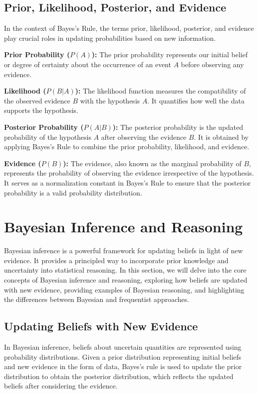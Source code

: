 \documentclass[12pt]{book} %
\begin{document}
\subsection{Prior, Likelihood, Posterior, and Evidence}
In the context of Bayes's Rule, the terms prior, likelihood, posterior, and evidence play crucial roles in updating probabilities based on new information.

\textbf{Prior Probability (\(P(A)\)):} The prior probability represents our initial belief or degree of certainty about the occurrence of an event \(A\) before observing any evidence.

\textbf{Likelihood (\(P(B | A)\)):} The likelihood function measures the compatibility of the observed evidence \(B\) with the hypothesis \(A\). It quantifies how well the data supports the hypothesis.

\textbf{Posterior Probability (\(P(A | B)\)):} The posterior probability is the updated probability of the hypothesis \(A\) after observing the evidence \(B\). It is obtained by applying Bayes's Rule to combine the prior probability, likelihood, and evidence.

\textbf{Evidence (\(P(B)\)):} The evidence, also known as the marginal probability of \(B\), represents the probability of observing the evidence irrespective of the hypothesis. It serves as a normalization constant in Bayes's Rule to ensure that the posterior probability is a valid probability distribution.

\section{Bayesian Inference and Reasoning}

Bayesian inference is a powerful framework for updating beliefs in light of new evidence. It provides a principled way to incorporate prior knowledge and uncertainty into statistical reasoning. In this section, we will delve into the core concepts of Bayesian inference and reasoning, exploring how beliefs are updated with new evidence, providing examples of Bayesian reasoning, and highlighting the differences between Bayesian and frequentist approaches.

\subsection{Updating Beliefs with New Evidence}

In Bayesian inference, beliefs about uncertain quantities are represented using probability distributions. Given a prior distribution representing initial beliefs and new evidence in the form of data, Bayes's rule is used to update the prior distribution to obtain the posterior distribution, which reflects the updated beliefs after considering the evidence.
\end{document}
